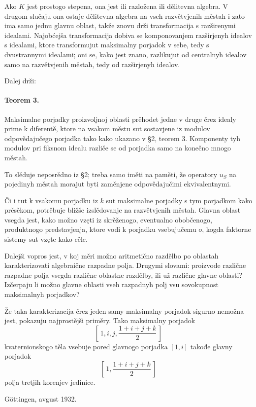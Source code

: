 \documentclass[11pt]{article}
\begin{document}
Ako \(K\) jest prostogo stepena, ona jest ili razložena ili dělitevna algebra. V drugom slučaju ona ostaje dělitevna algebra na vseh razvětvjenih městah i zato ima samo jednu glavnu oblast, takže znovu drži transformacija s razširenymi idealami. Najobćejša transformacija dobiva se komponovanjem razširjenyh idealov s idealami, ktore transformujut maksimalny porjadok v sebe, tedy s dvustrannymi idealami; oni se, kako jest znano, razlikujut od centralnyh idealov samo na razvětvjenih městah, tedy od razširjenyh idealov.

Dalej drži:

\paragraph{Teorem 3.}
Maksimalne porjadky proizvoljnoj oblasti prěhodet jedne v druge črez idealy prime k diferentě, ktore na vsakom městu sut sostavjene iz modulov odpovědajučego porjadka tako kako ukazano v §2, teorem 3. Komponenty tyh modulov pri fiksnom idealu različe se od porjadka samo na konečno mnogo městah.

To slěduje neposrědno iz §2; treba samo iměti na paměti, že operatory \(u_S\) na pojedinyh městah morajut byti zaměnjene odpovědajučimi ekvivalentnymi.

Či i tut k vsakomu porjadku iz \(k\) sut maksimalne porjadky s tym porjadkom kako prěsěkom, potrěbuje bližše izslědovanje na razvětvjenih městah. Glavna oblast vsegda jest, kako možno vzęti iz skrěženogo, eventualno obobčenogo, produktnogo predstavjenja, ktore vodi k porjadku vsebujučemu \(o\), kogda faktorne sistemy sut vzęte kako cěle.

Dalejši vopros jest, v koj měri možno aritmetično razdělbo po oblastah karakterizovati algebraične razpadne polja. Drugymi slovami: proizvode različne razpadne polja vsegda različne oblastne razdělby, ili už različne glavne oblasti? Izčerpaju li možno glavne oblasti vseh razpadnyh polj vsu sovokupnost maksimalnyh porjadkov?

Že taka karakterizacija črez jeden samy maksimalny porjadok sigurno nemožna jest, pokazuju najprostějši priměry. Tako maksimalny porjadok
\[
        \left[\,1,i,j,\frac{1+i+j+k}{2}\,\right]
\]
kvaternionskogo těla vsebuje pored glavnogo porjadka \([1,i]\) takođe glavny porjadok
\[
        \left[\,1,\frac{1+i+j+k}{2}\,\right]
\]
polja tretjih korenjev jedinice.

\begin{center}
Göttingen, avgust 1932.
\end{center}
\clearpage
\end{document}
